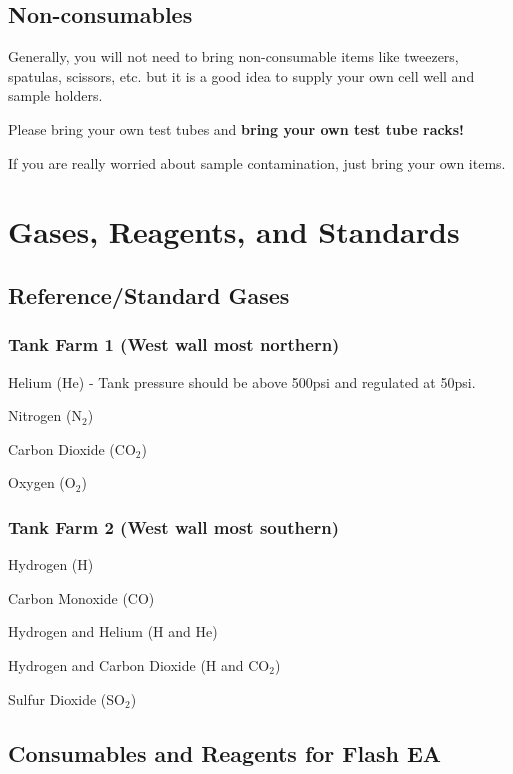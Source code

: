 \documentclass[12pt]{../SOP4_alpha}\usepackage[]{graphicx}\usepackage[]{color}
\begin{document}
\subsection{Non-consumables}

\NP Generally, you will not need to bring non-consumable items like tweezers, spatulas, scissors, etc. but it is a good idea to supply your own cell well and sample holders.

\NP Please bring your own test tubes and \textbf{bring your own test tube racks!}

\NP If you are really worried about sample contamination, just bring your own items.

\section{Gases, Reagents, and Standards}

\subsection{Reference/Standard Gases}

\subsubsection{Tank Farm 1 (West wall most northern)}

\NP Helium (He) - Tank pressure should be above 500psi and regulated at 50psi.

\NP Nitrogen (N$_2$)

\NP Carbon Dioxide (CO$_2$)

\NP Oxygen (O$_2$)

\subsubsection{Tank Farm 2 (West wall most southern)}

\NP Hydrogen (H)

\NP Carbon Monoxide (CO)

\NP Hydrogen and Helium (H and He)

\NP Hydrogen and Carbon Dioxide (H and CO$_2$)

\NP Sulfur Dioxide (SO$_2$)

\subsection{Consumables and Reagents for Flash EA} \label{subsec:Consumables and Reagents for Flash EA}
\end{document}
